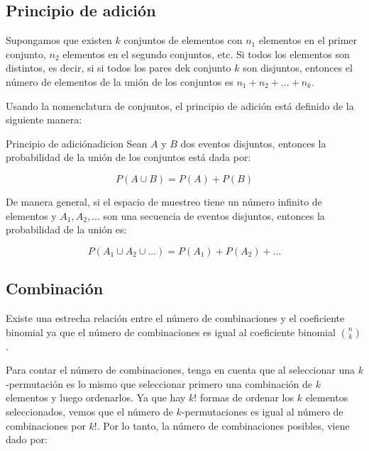 \subsection{Principio de adición}

Supongamos que existen $k$ conjuntos de elementos con $n_1$ elementos en el
primer conjunto, $n_2$ elementos en el segundo conjuntos, etc. Si todos los
elementos son distintos, es decir, si si todos los pares dek conjunto $k$ son
disjuntos, entonces el número de elementos de la unión de los conjuntos es $n_1
+ n_2 + ... + n_k $.

Usando la nomenclatura de conjuntos, el principio de adición está definido de la
siguiente manera:

\begin{theorem}{Principio de adición}{adicion}
Sean $A$ y $B$ dos eventos disjuntos, entonces la probabilidad de la unión de
los conjuntos está dada por:

\begin{equation}
	P(A \cup B) = P(A) + P(B)
\end{equation}

De manera general, si el espacio de muestreo tiene un número infinito de
elementos y $A_1, A_2, ... $ son una secuencia de eventos disjuntos, entonces la
probabilidad de la unión es:

\begin{equation}
	P(A_1 \cup A_2 \cup ...) = P(A_1) + P(A_2) + ...
\end{equation}

\end{theorem}





\subsection{Combinación}

Existe una estrecha relaci\'on entre el n\'umero de combinaciones y el
coeficiente binomial ya que el n\'umero de combinaciones es igual al coeficiente
binomial $\binom{n}{k}$.

Para contar el n\'umero de combinaciones, tenga en cuenta que al seleccionar una
$k$-permutación es lo mismo que seleccionar primero una combinación de $k$ elementos
y luego ordenarlos. Ya que hay $k!$ formas de ordenar los $k$ elementos
seleccionados, vemos que el número de $k$-permutaciones es igual al n\'umero de
combinaciones por $k!$. Por lo tanto, la n\'umero de combinaciones posibles,
viene dado por:

